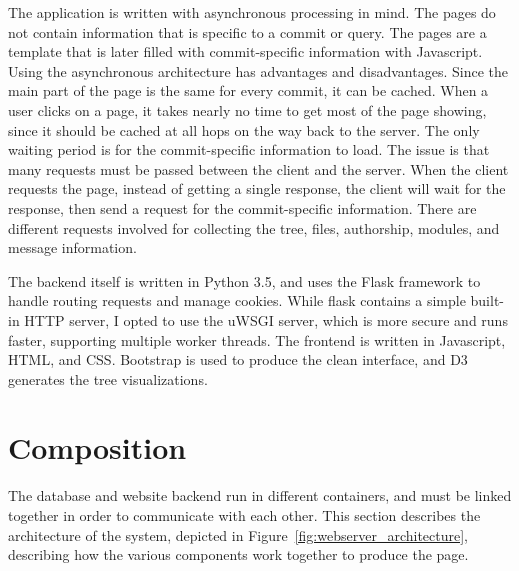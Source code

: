 The application is written with asynchronous processing in mind.
The pages do not contain information that is specific to a commit or
query.
The pages are a template that is later filled with commit-specific
information with Javascript.
Using the asynchronous architecture has advantages and disadvantages.
Since the main part of the page is the same for every commit,
it can be cached.
When a user clicks on a page, it takes nearly no time to get most of
the page showing, since it should be cached at all hops on the way back
to the server.
The only waiting period is for the commit-specific information to load.
The issue is that many requests must be passed between the client and
the server.
When the client requests the page, instead of getting a single
response, the client will wait for the response, then send a request
for the commit-specific information.
There are different requests involved for collecting the tree, files,
authorship, modules, and message information.

The backend itself is written in Python 3.5, and uses the Flask
framework to handle routing requests and manage cookies. While flask
contains a simple built-in HTTP server, I opted to use the uWSGI server,
which is more secure and runs faster, supporting multiple worker
threads. The frontend is written in Javascript, HTML, and CSS. Bootstrap
is used to produce the clean interface, and D3 generates the tree
visualizations.

\section{Composition}\label{sec:composition}

The database and website backend run in different containers, and must
be linked together in order to communicate with each other. This section
describes the architecture of the system, depicted in
Figure~\ref{fig:webserver_architecture}, describing how the various
components work together to produce the page.

